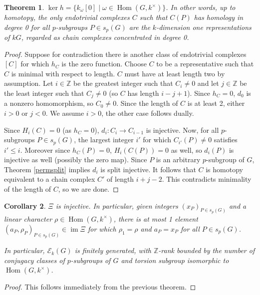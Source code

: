 \documentclass[10pt,letterpaper, boxed, cm]{amsart}
\newcommand{\Z}{\mathbb{Z}}
\newcommand{\Hom}{\operatorname{Hom}}
\newcommand{\im}{\operatorname{im}}
\newcommand{\calE}{\mathcal{E}}
\newtheorem{theorem}{Theorem}[section]
\newtheorem{corollary}[theorem]{Corollary}
\theoremstyle{remark}
\theoremstyle{definition}
\begin{document}
	\begin{theorem}\label{kernelthm}
		$\ker h = \{k_{\omega}[0] \mid \omega \in \Hom(G, k^\times)\}$. In other words, up to homotopy, the only endotrivial complexes $C$ such that $C(P)$ has homology in degree 0 for all $p$-subgroups $P \in s_p(G)$ are the $k$-dimension one representations of $kG$, regarded as chain complexes concentrated in degree 0.
	\end{theorem}
	\begin{proof}
		Suppose for contradiction there is another class of endotrivial complexes $[C]$ for which $h_C$ is the zero function. Choose $C$ to be a representative such that $C$ is minimal with respect to length. $C$ must have at least length two by assumption. Let $i \in \Z$ be the greatest integer such that $C_i \neq 0$ and let $j \in \Z$ be the least integer such that $C_j \neq 0$ (so $C$ has length $i - j + 1$). Since $h_C = 0$, $d_0$ is a nonzero homomorphism, so $C_0 \neq 0$. Since the length of $C$ is at least 2, either $i > 0$ or $j < 0$. We assume  $i > 0$, the other case follows dually.

		Since $H_i(C) = 0$ (as $h_C = 0$), $d_i: C_i \to C_{i-1}$ is injective. Now, for all $p$-subgroups $P\in s_p(G)$, the largest integer $i'$ for which $C_{i'}(P) \neq 0$ satisfies $i' \leq i$. Moreover since $h_C(P) = 0$, $H_i(C(P)) = 0$ as well, so $d_i(P)$ is injective as well (possibly the zero map). Since $P$ is an arbitrary $p$-subgroup of $G$, Theorem \ref{permsplit} implies $d_i$ is split injective. It follows that $C$ is homotopy equivalent to a chain complex $C'$ of length $i+j-2$. This contradicts minimality of the length of $C$, so we are done.
	\end{proof}

	\begin{corollary}
		$\Xi$ is injective. In particular, given integers $(x_P)_{P\in s_p(G)}$ and a linear character $\rho \in \Hom(G,k^\times)$, there is at most 1 element $(a_P, \rho_P)_{P\in s_p(G)} \in \im \Xi$ for which  $\rho_1 = \rho$ and $a_P = x_P$ for all $P\in s_p(G)$.

		In particular, $\calE_k(G)$ is finitely generated, with $\Z$-rank bounded by the number of conjugacy classes of $p$-subgroups of $G$ and torsion subgroup isomorphic to $\Hom(G,k^\times)$.
	\end{corollary}
	\begin{proof}
	    This follows immediately from the previous theorem.
	\end{proof}
\end{document}
